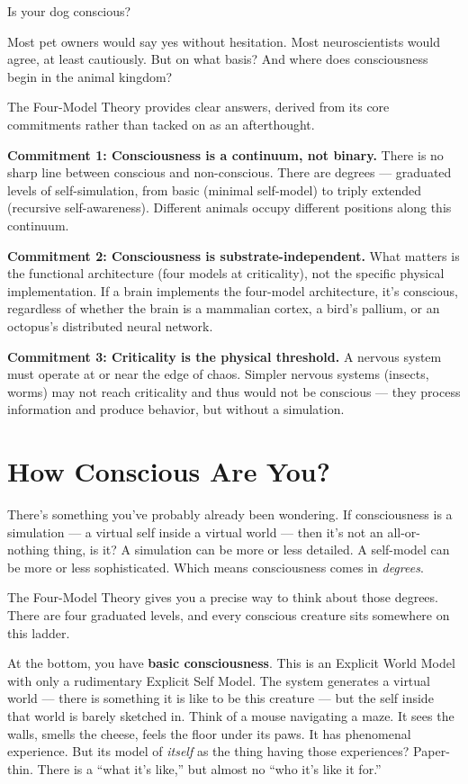 \documentclass[11pt, twoside, openright]{book}
\begin{document}
Is your dog conscious?

Most pet owners would say yes without hesitation. Most neuroscientists would agree, at least cautiously. But on what basis? And where does consciousness begin in the animal kingdom?

The Four-Model Theory provides clear answers, derived from its core commitments rather than tacked on as an afterthought.

\textbf{Commitment 1: Consciousness is a continuum, not binary.} There is no sharp line between conscious and non-conscious. There are degrees --- graduated levels of self-simulation, from basic (minimal self-model) to triply extended (recursive self-awareness). Different animals occupy different positions along this continuum.

\textbf{Commitment 2: Consciousness is substrate-independent.} What matters is the functional architecture (four models at criticality), not the specific physical implementation. If a brain implements the four-model architecture, it's conscious, regardless of whether the brain is a mammalian cortex, a bird's pallium, or an octopus's distributed neural network.

\textbf{Commitment 3: Criticality is the physical threshold.} A nervous system must operate at or near the edge of chaos. Simpler nervous systems (insects, worms) may not reach criticality and thus would not be conscious --- they process information and produce behavior, but without a simulation.

\section*{How Conscious Are You?}

There's something you've probably already been wondering. If consciousness is a simulation --- a virtual self inside a virtual world --- then it's not an all-or-nothing thing, is it? A simulation can be more or less detailed. A self-model can be more or less sophisticated. Which means consciousness comes in \textit{degrees}.

The Four-Model Theory gives you a precise way to think about those degrees. There are four graduated levels, and every conscious creature sits somewhere on this ladder.

At the bottom, you have \textbf{basic consciousness}. This is an Explicit World Model with only a rudimentary Explicit Self Model. The system generates a virtual world --- there is something it is like to be this creature --- but the self inside that world is barely sketched in. Think of a mouse navigating a maze. It sees the walls, smells the cheese, feels the floor under its paws. It has phenomenal experience. But its model of \textit{itself} as the thing having those experiences? Paper-thin. There is a ``what it's like,'' but almost no ``who it's like it for.''
\end{document}
